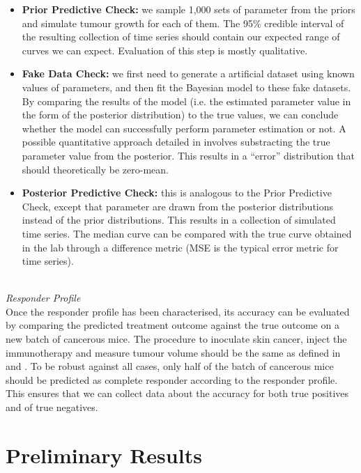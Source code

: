 \documentclass[11pt]{article}
\begin{document}
\begin{itemize}
    \item \textbf{Prior Predictive Check:} we sample 1,000 sets of parameter from the priors and simulate tumour growth for each of them. The 95\% credible interval of the resulting collection of time series should contain our expected range of curves we can expect. Evaluation of this step is mostly qualitative.
    \item \textbf{Fake Data Check:} we first need to generate a artificial dataset using known values of parameters, and then fit the Bayesian model to these fake datasets. By comparing the results of the model (i.e. the estimated parameter value in the form of the posterior distribution) to the true values, we can conclude whether the model can successfully perform parameter estimation or not. A possible quantitative approach detailed in \cite{rosenbaum} involves substracting the true parameter value from the posterior. This results in a ``error'' distribution that should theoretically be zero-mean.
    \item \textbf{Posterior Predictive Check:} this is analogous to the Prior Predictive Check, except that parameter are drawn from the posterior distributions instead of the prior distributions. This results in a collection of simulated time series. The median curve can be compared with the true curve obtained in the lab through a difference metric (MSE is the typical error metric for time series). 
\end{itemize}
~\\[11pt]
%

\textit{Responder Profile}\\[3pt]
Once the responder profile has been characterised, its accuracy can be evaluated by comparing the predicted treatment outcome against the true outcome on a new batch of cancerous mice. The procedure to inoculate skin cancer, inject the immunotherapy and measure tumour volume should be the same as defined in \cite{cbdil12} and \cite{takuya}. To be robust against all cases, only half of the batch of cancerous mice should be predicted as complete responder according to the responder profile. This ensures that we can collect data about the accuracy for both true positives and of true negatives.

\section{Preliminary Results}
\end{document}
